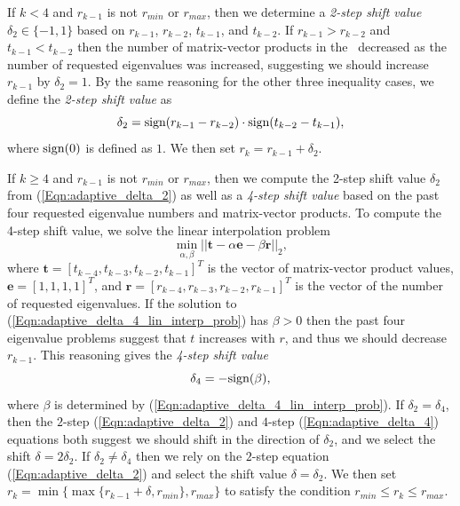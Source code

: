 If $k < 4$ and $r_{k-1}$ is not $r_{min}$ or $r_{max}$, then we determine a \textit{2-step shift value} $\delta_2 \in \{-1, 1\}$ based on $r_{k-1}$, $r_{k-2}$, $t_{k-1}$, and $t_{k-2}$.
If $r_{k-1} > r_{k-2}$ and $t_{k-1} < t_{k-2}$ then the number of matrix-vector products in the \emep \ decreased as the number of requested eigenvalues was increased, suggesting we should increase $r_{k-1}$ by $\delta_2 = 1$.
By the same reasoning for the other three inequality cases, we define the
\textit{2-step shift value} as
\begin{equation}				\label{Eqn:adaptive_delta_2}
\delta_2 = \textnormal{sign}(r_{k-1} - r_{k-2}) \cdot \textnormal{sign}(t_{k-2} - t_{k-1}),
\end{equation}
where $\textnormal{sign}(0)$ is defined as $1$.
We then set $r_k = r_{k-1} + \delta_2$.



If $k \geq 4$ and $r_{k-1}$ is not $r_{min}$ or $r_{max}$, then we compute the 2-step shift value $\delta_2$ from (\ref{Eqn:adaptive_delta_2})
as well as a \textit{4-step shift value} based on the past four requested eigenvalue numbers and matrix-vector products.
To compute the 4-step shift value, we solve the linear interpolation problem
\begin{equation} 			\label{Eqn:adaptive_delta_4_lin_interp_prob}
\min_{\alpha, \beta} || \mathbf{t} - \alpha \mathbf{e} - \beta \mathbf{r} ||_2,
\end{equation}
where $\mathbf{t} = [t_{k-4}, t_{k-3}, t_{k-2}, t_{k-1}]^T$ is the vector of matrix-vector product values, $\mathbf{e} = [1,1,1,1]^T$, and $\mathbf{r} = [r_{k-4}, r_{k-3}, r_{k-2}, r_{k-1}]^T$ is the vector of the number of requested eigenvalues.
If the solution to (\ref{Eqn:adaptive_delta_4_lin_interp_prob}) has $\beta > 0$ then the past four eigenvalue problems suggest that $t$ increases with $r$, and thus we should decrease $r_{k-1}$.
This reasoning gives the \textit{4-step shift value}
\begin{equation}			\label{Eqn:adaptive_delta_4}
\delta_4 = -\textnormal{sign}(\beta),
\end{equation}
where $\beta$ is determined by (\ref{Eqn:adaptive_delta_4_lin_interp_prob}).
If $\delta_2 = \delta_4$, then the $2$-step (\ref{Eqn:adaptive_delta_2}) and $4$-step (\ref{Eqn:adaptive_delta_4})  equations both suggest we should shift in the direction of $\delta_2$, and we select the shift $\delta = 2\delta_2$.
If $\delta_2 \neq \delta_4$ then we rely on the $2$-step equation (\ref{Eqn:adaptive_delta_2}) and select the shift value $\delta = \delta_2$.
We then set $r_k =\min \{ \max \{ r_{k-1} + \delta, r_{min} \}, r_{max} \}$ to satisfy the condition $r_{min} \leq r_k \leq r_{max}$.




